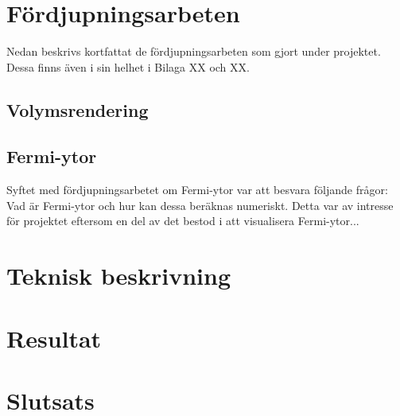 \documentclass[a4paper,12pt]{article}
\begin{document}
\section{Fördjupningsarbeten}
\label{ch:fordjupningsarbeten}
Nedan beskrivs kortfattat de fördjupningsarbeten som gjort under projektet. Dessa finns även i sin helhet i Bilaga XX och XX. 
\subsection{Volymsrendering}
\subsection{Fermi-ytor}
Syftet med fördjupningsarbetet om Fermi-ytor var att besvara följande frågor: Vad är Fermi-ytor och hur kan dessa beräknas numeriskt. Detta var av intresse för projektet eftersom en del av det bestod i att visualisera Fermi-ytor...

\section{Teknisk beskrivning}

\section{Resultat}

\section{Slutsats}


\newpage
{}
\printbibliography{}
\end{document}
